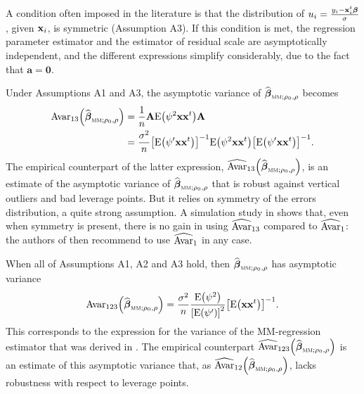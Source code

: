 A condition often imposed in the literature is that the distribution of
$u_{i}=\frac{y_{i}-\mathbf x_{i}^{t}\boldsymbol\beta}{\sigma}$, given
$\mathbf x_{i}$, is symmetric (Assumption A3). If this condition is met, the
regression parameter estimator and the estimator of residual scale are
asymptotically independent, and the different expressions simplify
considerably, due to the fact that $\mathbf{a}=\mathbf{0}$.

Under Assumptions A1 and A3, the asymptotic variance of $\widehat
{\boldsymbol\beta}_{\stsc{MM};\rho_{0},\rho}$ becomes
\begin{align*}
\mathrm{Avar}_{13}\left(  \sthat{\boldsymbol\beta}_{\stsc{MM};\rho
_{0},\rho}\right)   &  =\frac{1}{n}\mathbf{A}\mathrm{E}\left(  \psi
^{2}\mathbf{xx}^{t}\right)  \mathbf{A}\\
&  =\frac{\sigma^{2}}{n}\left[  \mathrm{E}\left(  \psi^{\prime}\mathbf{xx}%
^{t}\right)  \right]  ^{-1}\mathrm{E}\left(  \psi^{2}\mathbf{xx}^{t}\right)
\left[  \mathrm{E}\left(  \psi^{\prime}\mathbf{xx}^{t}\right)  \right]  ^{-1}.
\end{align*}
The empirical counterpart of the latter expression, $\sthat{\mathrm{Avar}%
}_{13}\left(  \sthat{\boldsymbol\beta}_{\stsc{MM};\rho_{0},\rho}\right)
$, is an estimate of the asymptotic variance of $\sthat{\boldsymbol\beta%
}_{\stsc{MM};\rho_{0},\rho}$ that is robust against vertical outliers and
bad leverage points. But it relies on symmetry of the errors distribution, a
quite strong assumption. A simulation study in \cite{Croux:2003} shows that, even when symmetry is present, there is no gain in using
$\widehat{\mathrm{Avar}}_{13}$ compared to $\widehat{\mathrm{Avar}}_{1}$: the
authors of \cite{Croux:2003} then recommend to use
$\widehat{\mathrm{Avar}}_{1}$ in any case.

When all of Assumptions A1, A2 and A3 hold, then $\sthat{\boldsymbol\beta%
}_{\stsc{MM};\rho_{0},\rho}$ has asymptotic variance
\[
\mathrm{Avar}_{123}\left(  \sthat{\boldsymbol\beta}_{\stsc{MM};\rho
_{0},\rho}\right)  =\frac{\sigma^{2}}{n}\frac{\mathrm{E}\left(  \psi
^{2}\right)  }{\left[  \mathrm{E}\left(  \psi^{\prime}\right)  \right]  ^{2}%
}\left[  \mathrm{E}\left(  \mathbf{xx}^{t}\right)  \right]  ^{-1}.
\]
This corresponds to the expression for the variance of the MM-regression
estimator that was derived in \cite{yohai:1987}. The empirical counterpart
$\sthat{\mathrm{Avar}}_{123}\left(  \sthat{\boldsymbol\beta%
}_{\stsc{MM};\rho_{0},\rho}\right)  $ is an estimate of this asymptotic
variance that, as $\sthat{\mathrm{Avar}}_{12}\left(  \widehat
{\boldsymbol\beta}_{\stsc{MM};\rho_{0},\rho}\right)  $, lacks robustness
with respect to leverage points.

